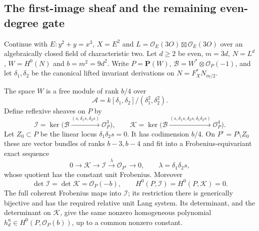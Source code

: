 \subsection{The first-image sheaf and the remaining even-degree gate}
\label{subsec:ss-even-image-sheaf-candidate}

Continue with $E:y^2+y=x^3$, $X=E^2$ and
$L=\mathcal O_E(3O)\boxtimes\mathcal O_E(3O)$ over an
algebraically closed field of characteristic two. Let $d\ge2$ be
even, $m=3d$, $N=L^d$, $W=H^0(N)$ and $b=m^2=9d^2$.
Write $P=\mathbf P(W)$, $\mathcal B=W^*\otimes\mathcal O_P(-1)$,
and let $\delta_1,\delta_2$ be the canonical lifted invariant
derivations on $N=F_X^*N_{m/2}$.

\begin{lemma}
\label{lem:ss-even-image-sheaf-candidate}
The space $W$ is a free module of rank $b/4$ over
\[
 \mathcal A=k[\delta_1,\delta_2]/(\delta_1^2,\delta_2^2).
\]
Define reflexive sheaves on $P$ by
\[
 \mathcal I=\ker\bigl(\mathcal B\xrightarrow{(s,\delta_1s,\delta_2s)}
                                  \mathcal O_P^3\bigr),\qquad
 \mathcal K=\ker\bigl(\mathcal B\xrightarrow{
 (s,\delta_1s,\delta_2s,\delta_1\delta_2s)}\mathcal O_P^4\bigr).
\]
Let $Z_0\subset P$ be the linear locus $\delta_1\delta_2s=0$.
It has codimension $b/4$. On $P^\circ=P\setminus Z_0$ these are
vector bundles of ranks $b-3,b-4$ and fit into a Frobenius-equivariant
exact sequence
\[
 0\longrightarrow\mathcal K\longrightarrow\mathcal I
        \xrightarrow{\lambda}\mathcal O_{P^\circ}\longrightarrow0,
 \qquad \lambda=\delta_1\delta_2s,
\]
whose quotient has the constant unit Frobenius. Moreover
\[
 \det\mathcal I=\det\mathcal K=\mathcal O_P(-b),\qquad
 H^0(P,\mathcal I)=H^0(P,\mathcal K)=0.
\]
The full coherent Frobenius maps into $\mathcal I$; its restriction
there is generically bijective and has the required relative unit
Lang system. Its determinant, and the determinant on $\mathcal K$,
give the same nonzero homogeneous polynomial
$h_d^{\mathrm u}\in H^0(P,\mathcal O_P(b))$, up to a common
nonzero constant.
\end{lemma}

